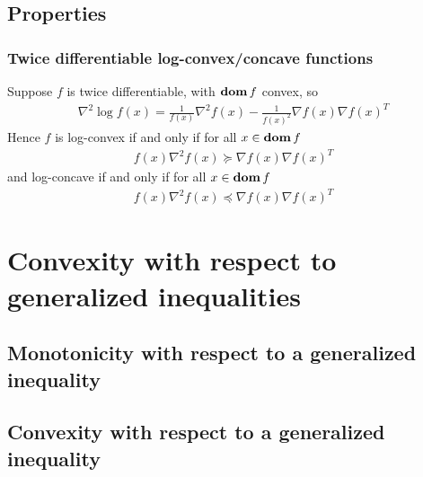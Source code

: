 \subsection{Properties}
\subsubsection{Twice differentiable log-convex/concave functions}
Suppose $f$ is twice differentiable, with $\mathop{\bf dom} f$ convex, so
\begin{align*}
  \nabla^2 \log f(x)=\frac{1}{f(x)}\nabla^2 f(x)-\frac{1}{f(x)^2}\nabla f(x)\nabla f(x)^T
\end{align*}
Hence $f$ is log-convex if and only if for all $x\in\mathop{\bf dom} f$
\begin{align*}
  f(x)\nabla^2 f(x)\succeq\nabla f(x)\nabla f(x)^T
\end{align*}
and log-concave if and only if for all $x\in\mathop{\bf dom} f$
\begin{align*}
  f(x)\nabla^2 f(x)\preceq\nabla f(x)\nabla f(x)^T
\end{align*}
\begin{example}
\end{example}
\begin{example}
\end{example}
\begin{example}
\end{example}
\begin{example}
\end{example}

\section{Convexity with respect to generalized inequalities}

\subsection{Monotonicity with respect to a generalized inequality}
\begin{example}
\end{example}
\begin{example}
\end{example}

\subsection{Convexity with respect to a generalized inequality}
\begin{example}
\end{example}
\begin{example}
\end{example}
\begin{example}
\end{example}
